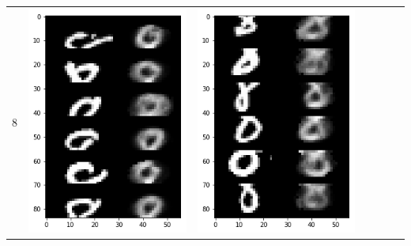 \documentclass[12pt]{report} %
\begin{document}
\begin{tabular}{m{0.7cm}m{2.4cm}m{2.4cm}m{2.4cm}m{2.4cm}m{2.4cm}m{2.4cm}}
	8 & \includegraphics[scale=0.3]{pictures/KE_8_up.png} & \includegraphics[scale=0.3]{pictures/KE_8_down.png} &

\end{tabular}
\end{document}
